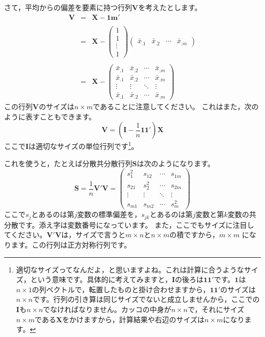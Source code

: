 \documentclass{ltjsbook}
\begin{document}
さて，平均からの偏差を要素に持つ行列$\bm{V}$を考えたとします。
\[
	\begin{array}{ccl}
		\bm{V} & = & \bm{X} - \bm{1} \bm{m}'                                                                                                                  \\
		       &   &                                                                                                                                          \\
		       & = & \bm{X} - \begin{pmatrix} 1 \\ 1 \\ \vdots \\ 1 \end{pmatrix} \begin{pmatrix} \bar{x}_{.1} & \bar{x}_{.2} & \cdots & \bar{x}_{.m} \end{pmatrix} \\
		       &   &                                                                                                                                          \\
		       & = & \bm{X} - \begin{pmatrix} \bar{x}_{.1} & \bar{x}_{.2} & \cdots & \bar{x}_{.m} \\
                \bar{x}_{.1} & \bar{x}_{.2} & \cdots & \bar{x}_{.m} \\
                \vdots     & \vdots     & \ddots & \vdots     \\
                \bar{x}_{.1} & \bar{x}_{.2} & \cdots & \bar{x}_{.m}\end{pmatrix}
	\end{array}
\]
この行列$\bm{V}$のサイズは$n \times m$であることに注意してください。
これはまた，次のように表すこともできます。
\[ \bm{V} = ( \bm{I} -\frac{1}{n}\bm{1} \bm{1} ')\bm{X} \]
ここで$\bm{I}$は適切なサイズの単位行列です\footnote{適切なサイズってなんだよ，と思いますよね。これは計算に合うようなサイズ，という意味です。具体的に考えてみますと，$\bm{I}$の後ろは$\bm{1}\bm{1}'$です。$\bm{1}$は$n\times 1$の列ベクトルで，転置したものと掛け合わせますから，$\bm{1}\bm{1}'$のサイズは$n \times n$です。行列の引き算は同じサイズでないと成立しませんから，ここでの$\bm{I}$も$n \times n$でなければなりません。カッコの中身が$n \times n$で，それにサイズ$n \times m$である$\bm{X}$をかけますから，計算結果や右辺のサイズは$n \times m$になります。}。

これを使うと，たとえば分散共分散行列$\bm{S}$は次のようになります。
\[ \bm{S} = \frac{1}{n} \bm{V}' \bm{V} = \begin{pmatrix}
		s_1^2  & s_{12} & \cdots & s_{1m} \\
		s_{21} & s_2^2  & \cdots & s_{2m} \\
		\vdots & \vdots & \ddots & \vdots \\
		s_{m1} & s_{m2} & \cdots & s_m^2\end{pmatrix} \]
ここで$s_j$とあるのは第$j$変数の標準偏差を，$s_{jk}$とあるのは第$j$変数と第$k$変数の共分散です。添え字は変数番号になっています。
また，ここでもサイズに注目してください。$\bm{V}'\bm{V}$は，サイズで言うと$m \times n$と$n \times m$の積ですから，$m \times m$ になります。この行列は正方対称行列です。
\end{document}
